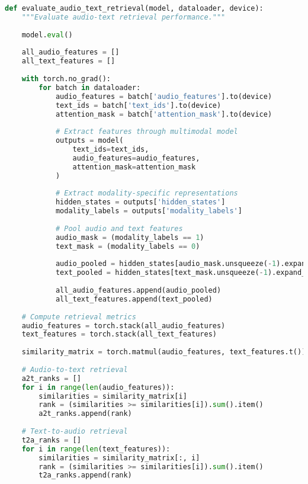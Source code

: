 \begin{lstlisting}[language=Python, caption=Audio-text retrieval evaluation]
def evaluate_audio_text_retrieval(model, dataloader, device):
    """Evaluate audio-text retrieval performance."""
    
    model.eval()
    
    all_audio_features = []
    all_text_features = []
    
    with torch.no_grad():
        for batch in dataloader:
            audio_features = batch['audio_features'].to(device)
            text_ids = batch['text_ids'].to(device)
            attention_mask = batch['attention_mask'].to(device)
            
            # Extract features through multimodal model
            outputs = model(
                text_ids=text_ids,
                audio_features=audio_features,
                attention_mask=attention_mask
            )
            
            # Extract modality-specific representations
            hidden_states = outputs['hidden_states']
            modality_labels = outputs['modality_labels']
            
            # Pool audio and text features
            audio_mask = (modality_labels == 1)
            text_mask = (modality_labels == 0)
            
            audio_pooled = hidden_states[audio_mask.unsqueeze(-1).expand_as(hidden_states)].mean()
            text_pooled = hidden_states[text_mask.unsqueeze(-1).expand_as(hidden_states)].mean()
            
            all_audio_features.append(audio_pooled)
            all_text_features.append(text_pooled)
    
    # Compute retrieval metrics
    audio_features = torch.stack(all_audio_features)
    text_features = torch.stack(all_text_features)
    
    similarity_matrix = torch.matmul(audio_features, text_features.t())
    
    # Audio-to-text retrieval
    a2t_ranks = []
    for i in range(len(audio_features)):
        similarities = similarity_matrix[i]
        rank = (similarities >= similarities[i]).sum().item()
        a2t_ranks.append(rank)
    
    # Text-to-audio retrieval
    t2a_ranks = []
    for i in range(len(text_features)):
        similarities = similarity_matrix[:, i]
        rank = (similarities >= similarities[i]).sum().item()
        t2a_ranks.append(rank)
    

\end{lstlisting}
